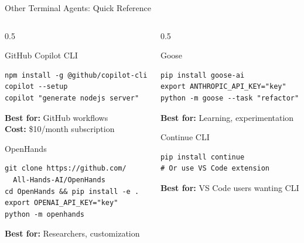 \documentclass[aspectratio=169,11pt]{beamer}
\begin{document}
\begin{frame}[fragile]{Other Terminal Agents: Quick Reference}
    \begin{columns}[T]
        \begin{column}{0.5\textwidth}
            \begin{block}{GitHub Copilot CLI}
                \begin{lstlisting}[style=bash,numbers=none]
npm install -g @github/copilot-cli
copilot --setup
copilot "generate nodejs server"
                \end{lstlisting}
                \textbf{Best for:} GitHub workflows\\
                \textbf{Cost:} \$10/month subscription
            \end{block}

            \begin{block}{OpenHands}
                \begin{lstlisting}[style=bash,numbers=none]
git clone https://github.com/
  All-Hands-AI/OpenHands
cd OpenHands && pip install -e .
export OPENAI_API_KEY="key"
python -m openhands
                \end{lstlisting}
                \textbf{Best for:} Researchers, customization
            \end{block}
        \end{column}
        \begin{column}{0.5\textwidth}
            \begin{block}{Goose}
                \begin{lstlisting}[style=bash,numbers=none]
pip install goose-ai
export ANTHROPIC_API_KEY="key"
python -m goose --task "refactor"
                \end{lstlisting}
                \textbf{Best for:} Learning, experimentation
            \end{block}

            \begin{block}{Continue CLI}
                \begin{lstlisting}[style=bash,numbers=none]
pip install continue
# Or use VS Code extension
                \end{lstlisting}
                \textbf{Best for:} VS Code users wanting CLI
            \end{block}
        \end{column}
    \end{columns}

\end{frame}
\end{document}
